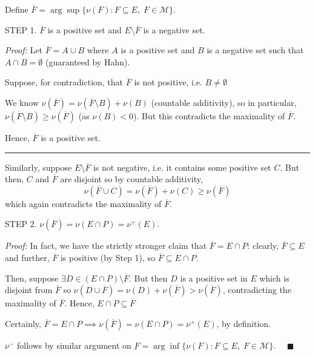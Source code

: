 \documentclass[12pt]{article}
\newcommand{\qed}{\quad \blacksquare}
\newcommand{\M}{\mathcal{M}}
\newcommand{\sub}{\subseteq}
\renewcommand{\div}{\vspace*{10pt}\hrule\vspace*{10pt}}
\renewcommand{\bar}[1]{\overline{#1}}
\newenvironment*{proof}[1][blue]{
\begin{tcolorbox}[
    parbox=false,
    colback=#1!5!white,
    colframe=#1!75!black,
    breakable
]}
{\end{tcolorbox}}
\begin{document}
        Define $\bar F = \arg\sup \{\nu(F) : F \sub E, \; F \in \M\}$.

        STEP 1. $\bar F$ is a positive set and $E \setminus \bar F$ is a negative set. 

        \begin{proof}
            \emph{Proof:} Let $\bar F = A \cup B$ where $A$ is a positive set and $B$ is a negative set such that $A \cap B = \emptyset$ (guaranteed by Hahn). 
            
            Suppose, for contradiction, that $\bar F$ is not positive, i.e. $B \neq \emptyset$ 

            We know $\nu(\bar F) = \nu(\bar F \setminus B) + \nu(B)$ (countable additivity), so in particular, $\nu(\bar F \setminus B) \geq \nu(\bar F) $ (as $\nu(B)< 0$). But this contradicts the maximality of $\bar F$. 

            Hence, $\bar F$ is a positive set.

            \div 

            Similarly, suppose $E \setminus \bar F$ is not negative, i.e. it contains some positive set $C$. But then, $C$ and $\bar F$ are disjoint so by countable additivity, 
            \[\nu(\bar F \cup C) = \nu(\bar F) + \nu(C) \geq \nu(\bar F)\]
            which again contradicts the maximality of $\bar F$.

        \end{proof}

        STEP 2. $\nu(\bar F) = \nu(E \cap P) = \nu^+(E)$. 

        \begin{proof}
            \emph{Proof:} In fact, we have the strictly stronger claim that $\bar F = E \cap P$: clearly, $\bar F \sub E$ and further, $\bar F$ is positive (by Step 1), so $\bar F \sub E \cap P$. 

            Then, suppose $\exists D \in (E \cap P) \setminus \bar F$. But then $D$ is a positive set in $E$ which is disjoint from $\bar F$ so $\nu(D \cup \bar F) = \nu(D) + \nu(\bar F) > \nu(\bar F)$, contradicting the maximality of $\bar F$. Hence, $E \cap P \sub \bar F$

            Certainly, $\bar F = E \cap P \implies \nu(\bar F) = \nu(E \cap P) = \nu^+(E)$, by definition.  
        \end{proof}        

        $\nu^-$ follows by similar argument on $\underbar F = \arg\inf \{\nu(F) : F \sub E, \; F \in \M\}$. $\qed$
\end{document}
